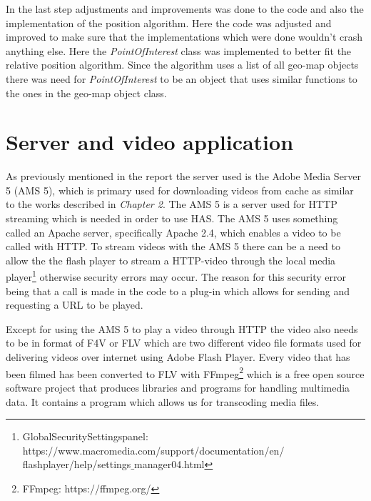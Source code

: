 In the last step adjustments and improvements was done to the code and also the implementation of the position algorithm. Here the code was adjusted and improved to make sure that the implementations which were done wouldn't crash anything else. Here the \textit{PointOfInterest} class was implemented to better fit the relative position algorithm. Since the algorithm uses a list of all geo-map objects there was need for \textit{PointOfInterest} to be an object that uses similar functions to the ones in the geo-map object class. 

\section{Server and video application}
\label{sec:server}

As previously mentioned in the report the server used is the Adobe Media Server 5 (AMS 5), which is primary used for downloading videos from cache as similar to the works described in \textit{Chapter 2}. The AMS 5 is a server used for HTTP streaming which is needed in order to use HAS. The AMS 5 uses something called an Apache server, specifically Apache 2.4, which enables a video to be called with HTTP. To stream videos with the AMS 5 there can be a need to allow the the flash player to stream a HTTP-video through the local media player\footnote{Global\:Security\:Settings\:panel: https://www.macromedia.com/support/documentation/en/\\flashplayer/help/settings$\_$manager04.html} otherwise security errors may occur. The reason for this security error being that a call is made in the code to a plug-in which allows for sending and requesting a URL to be played.

Except for using the AMS 5 to play a video through HTTP the video also needs to be in format of F4V or FLV which are two different video file formats used for delivering videos over internet using Adobe Flash Player. Every video that has been filmed has been converted to FLV with FFmpeg\footnote{FFmpeg: https://ffmpeg.org/} which is a free open source software project that produces libraries and programs for handling multimedia data. It contains a program which allows us for transcoding media files.

